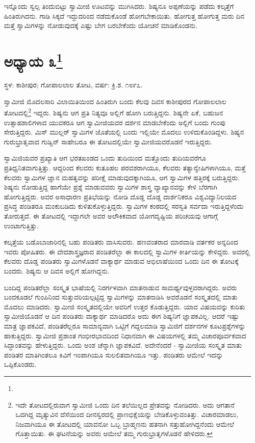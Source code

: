 ಇನ್ನೊಂದು ಸ್ವಲ್ಪ ತಿಂದುಬಿಟ್ಟು ಸ್ವಾಮೀಜಿ ಊಟವನ್ನು ಮುಗಿಸಿದರು. ಶಿಷ್ಯನೂ ಅಪ್ಪಣೆಯನ್ನು ಪಡೆದು ಕಲ್ಕತ್ತೆಗೆ ಹಿಂತಿರುಗಿದನು. ಗಾಡಿ ಸಿಕ್ಕದೆ ಇದ್ದುದರಿಂದ ನಡೆದುಕೊಂಡೆ ಹೋಗಬೇಕಾಯಿತು. ಹೋಗುತ್ತ ಹೋಗುತ್ತ ಮರು ದಿನ ಮತ್ತೆ ಸ್ವಾಮಿಗಳನ್ನು ನೋಡುವುದಕ್ಕೆ ಎಷ್ಟು ಬೇಗ ಬರಬೇಕೆಂದು ಯೋಚನೆ ಮಾಡಿಕೊಂಡನು.

\newpage

\chapter[ಅಧ್ಯಾಯ ೩]{ಅಧ್ಯಾಯ ೩\protect\footnote{}}

\centerline{ಸ್ಥಳ: ಕಾಶೀಪುರ; ಗೋಪಾಲಲಾಲ ತೋಟ, ವರ್ಷ: ಕ್ರಿ.ಶ. ೧೮೯೭.}

ಸ್ವಾಮೀಜಿ ಮೊದಲಸಾರಿ ವಿಲಾಯಿತಿಯಿಂದ ಹಿಂತಿರುಗಿ ಬಂದು ಕೆಲವು ದಿವಸ ಕಾಶೀಪುರದ ಗೋಪಾಲಲಾಲ ತೋಟದಲ್ಲಿ\footnote{ಇದೇ ತೋಟದಲ್ಲಿರುವಾಗ ಸ್ವಾಮೀಜಿ ಒಂದು ದಿನ ತಲೆಯಿಲ್ಲದ ಪ್ರೇತವನ್ನು ನೋಡಿದರು. ಅದು ಆಗತಾನೆ ಒದಗಿದ್ದ ಮೃತ್ಯುವಿನ ದೆಸೆಯಿಂದ ದೀನಸ್ವರದಲ್ಲಿ ಪ್ರಾಣಭಿಕ್ಷೆಯನ್ನು ಬೇಡಿಕೊಳ್ಳುವಂತಿತ್ತು. ವಿಚಾರಮಾಡಲು, ನಿಜವಾಗಿಯೂ ಈ ತೋಟದಲ್ಲಿ ಯಾವನೋ ಒಬ್ಬ ಬ್ರಾಹ್ಮಣನು ಹತನಾಗಿ ಸತ್ತುಹೋಗಿದ್ದನೆಂದು ಆಮೇಲೆ ಗೊತ್ತಾಯಿತು. ಈ ಘಟನೆಯನ್ನು ಅವರು ಆಮೇಲೆ ತಮ್ಮ ಗುರುಭ್ರಾತೃಗಳೊಡನೆ ಹೇಳಿದರು.} ಇದ್ದರು. ಶಿಷ್ಯನು ಆಗ ಪ್ರತಿ ನಿತ್ಯವೂ ಅಲ್ಲಿಗೆ ಹೋಗಿ ಬರುತ್ತಿದ್ದನು. ಶಿಷ್ಯನೇ ಏಕೆ, ಬಹುಜನ ಉತ್ಸಾಹಶಾಲಿಗಳಾದ ಯುವಕರೂ ಆಗ ಸ್ವಾಮೀಜಿಯವರ ದರ್ಶನ ಮಾಡಬೇಕೆಂದು ಅಲ್ಲಿಗೆ ಬಂದು ಗುಂಪು ಸೇರುತ್ತಿದ್ದರು. ಮಿಸ್ ಮುಲ್ಲರ್ ಸ್ವಾಮಿಗಳ ಜೊತೆಯಲ್ಲಿ ಬಂದು ಇಲ್ಲಿಯೇ ಮೊದಲು ಉಳಿದುಕೊಂಡಿದ್ದಳು. ಶಿಷ್ಯನ ಗುರುಭ್ರಾತೃವಾದ ಗುಡ್ವಿನ್ ಸಾಹೇಬರೂ ಈ ತೋಟದಲ್ಲಿಯೇ ಸ್ವಾಮೀಜಿಯವರೊಡನೆ ಇರುತ್ತಿದ್ದರು.

ಸ್ವಾಮಿಜಿಯವರ ಪ್ರಖ್ಯಾತಿ ಆಗ ಭರತಖಂಡದ ಒಂದು ತುದಿಯಿಂದ ಮತ್ತೊಂದು ತುದಿಯವರೆಗೂ ಪ್ರತಿಧ್ವನಿತವಾಗುತ್ತಿತ್ತು. ಆದ್ದರಿಂದ ಕೆಲವರು ಕುತೂಹಲ ಪರವಶರಾಗಿಯೂ, ಕೆಲವರು ತತ್ಯಾನ್ವೇಷಿಗಳಾಗಿಯೂ, ಮತ್ತೆ ಕೆಲವರು ಸ್ವಾಮಿಗಳ ಜ್ಞಾನ ಮಹತ್ವವನ್ನು ಪರೀಕ್ಷೆ ಮಾಡುವುದಕ್ಕಾಗಿಯೂ, ಆಗ ಸ್ವಾಮಿಗಳ ಹತ್ತಿರಕ್ಕೆ ಬರುತ್ತಿದ್ದರು. ಶಿಷ್ಯನು ನೋಡುತ್ತಿದ್ದ ಹಾಗೆಯೇ ಪ್ರಶ್ನೆ ಮಾಡುವವರು ಸ್ವಾಮಿಗಳ ಶಾಸ್ತ್ರ ವ್ಯಾಖ್ಯಾನವನ್ನು ಕೇಳಿ ಬೆರಗಾಗಿ ಹೋಗುತ್ತಿದ್ದರು. ಅವರ ಅಸಾಧಾರಣ ಪ್ರತಿಭೆಯನ್ನು ನೋಡಿ ದೊಡ್ಡ ದೊಡ್ಡ ದಾರ್ಶನಿಕರೂ ವಿಶ್ವವಿದ್ಯಾನಿಲಯದ ಪ್ರಸಿದ್ಧ ಪಂಡಿತರೂ ಮಂಕುಬಡಿದು ಕುಳಿತುಕೊಳ್ಳುತ್ತಿದ್ದರು. ಸ್ವಾಮಿಗಳ ಕಂಠದಲ್ಲಿ ಸರಸ್ವತಿ ಸರ್ವದಾ ಇರುತ್ತಿದ್ದಳೆಂದು ತೋರುತ್ತದೆ. ಈ ತೋಟದಲ್ಲಿ ಇದ್ದಾಗಲೇ ಅವರ ಅಲೌಕಿಕವಾದ ಯೋಗದೃಷ್ಟಿಯ ಪರಿಚಯವು ಆಗಾಗ್ಗೆ ಉಂಟಾಗುತ್ತಿತ್ತು.

ಕಲ್ಕತ್ತೆಯ ಬಡೊಬಾಜಾರಿನಲ್ಲಿ ಬಹು ಪಂಡಿತರು ವಾಸಿಸುವರು. ಹಣವಂತರಾದ ಮಾರವಾಡಿ ವರ್ತಕರ ಅನ್ನದಿಂದ ಇವರು ಪೋಷಿತರು. ಈ ವೇದಶಾಸ್ತ್ರಜ್ಞರಾದ ಪಂಡಿತರೆಲ್ಲಾ ಈ ಕಾಲದಲ್ಲಿ ಸ್ವಾಮಿಗಳ ಕೀರ್ತಿಯನ್ನು ಕೇಳಿದ್ದರು. ಅವರಲ್ಲಿ ಕೆಲವರು ದೊಡ್ಡ ಪಂಡಿತರು ಸ್ವಾಮಿಗಳೊಡನೆ ವಾಕ್ಯಾರ್ಥ ಮಾಡುವ ಅಭಿಲಾಷೆಯಿಂದ ಒಂದು ದಿನ ಈ ತೋಟಕ್ಕೆ ಬಂದರು. ಶಿಷ್ಯನು ಆ ದಿವಸ ಅಲ್ಲಿಗೆ ಹೋಗಿದ್ದನು.

ಬಂದಿದ್ದ ಪಂಡಿತರೆಲ್ಲಾ ಸಂಸ್ಕೃತ ಭಾಷೆಯಲ್ಲಿ ನಿರರ್ಗಳವಾಗಿ ಮಾತನಾಡುವ ಸಾಮರ್ಥ್ಯವುಳ್ಳವರಾಗಿದ್ದರು. ಅವರು ಬಂದಕೂಡಲೆ ಗುಂಪಿನಿಂದ ಸುತ್ತುವರಿಯಲ್ಪಟ್ಟಿದ್ದ ಸ್ವಾಮಿಗಳನ್ನು ಮಾತನಾಡಿಸಿ ಅವರೊಡನೆ ಸಂಸ್ಕೃತದಲ್ಲಿ ಮಾತು ಮೊದಲು ಮಾಡಿದರು. ಸ್ವಾಮೀಜಿ ಸಂಸ್ಕೃತದಲ್ಲಿಯೇ ಅವರಿಗೆ ಉತ್ತರ ಕೊಡುತ್ತಿದ್ದರು. ಯಾವ ವಿಷಯವನ್ನು ಕುರಿತು ಸ್ವಾಮೀಜಿಯೊಡನೆ ಆ ದಿನ ಪಂಡಿತರು ವಾಕ್ಯಾರ್ಥ ಮಾಡಿದರೊ ಅದು ಈಗ ಶಿಷ್ಯನಿಗೆ ಜ್ಞಾಪಕವಿಲ್ಲ. ಆದರೆ ಇಷ್ಟು ಮಾತ್ರ ಜ್ಞಾಪಕವಿದೆ, ಪಂಡಿತರೆಲ್ಲರೂ ಸಾಮಾನ್ಯವಾಗಿ ಒಟ್ಟಿಗೆ ಗದ್ದಲಮಾಡಿ ಸ್ವಾಮಿಜಿಗೆ ದರ್ಶನಗಳ ಕೂಟಪ್ರಶ್ನೆಗಳನ್ನು ಹಾಕುತ್ತಿದ್ದರು. ಸ್ವಾಮೀಜಿ ಪ್ರಶಾಂತ ಗಂಭೀರಭಾವದಿಂದ ನಿಧಾನವಾಗಿ ಈ ವಿಷಯಗಳಲ್ಲಿ ತಮ್ಮ ವಿಚಾರಪೂರ್ವಕವಾದ ಸಿದ್ಧಾಂತವನ್ನು ಹೇಳುತ್ತಿದ್ದರು. ಒಂದು ಅಂಶ ಚೆನ್ನಾಗಿ ಜ್ಞಾಪಕವಿದೆ. ಅದೇನೆಂದರೆ - ಸ್ವಾಮೀಜಿಯ ಸಂಸ್ಕೃತ ಮಾತು ಪಂಡಿತರ ಮಾತಿಗಿಂತಲೂ ಕಿವಿಗೆ ಇಂಪಾಗಿಯೂ ಸುಲಲಿತವಾಗಿಯೂ ಇತ್ತು. ಪಂಡಿತರು ಆಮೇಲೆ ಇದನ್ನು ಒಪ್ಪಿಕೊಂಡರು.

